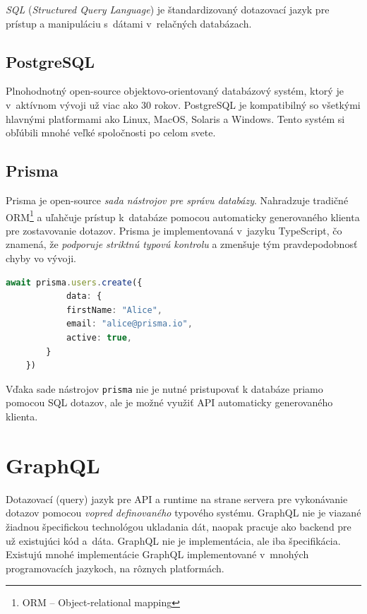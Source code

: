\noindent \emph{SQL} (\emph{Structured Query Language}) je štandardizovaný dotazovací jazyk pre prístup a manipuláciu s~dátami v~relačných databázach.

\subsection{PostgreSQL}
Plnohodnotný open-source objektovo-orientovaný databázový systém, ktorý je v~aktívnom vývoji už viac ako 30 rokov. PostgreSQL je kompatibilný so všetkými hlavnými platformami ako Linux, MacOS, Solaris a Windows. Tento systém si obľúbili mnohé veľké spoločnosti po celom svete. \cite{PostgreSQL}

\subsection{Prisma}
Prisma je open-source \emph{sada nástrojov pre správu databázy}. Nahradzuje tradičné ORM\footnote{ORM -- Object-relational mapping} a uľahčuje prístup k~databáze pomocou automaticky generovaného klienta pre zostavovanie dotazov. Prisma je implementovaná v~jazyku TypeScript, čo znamená, že \emph{podporuje striktnú typovú kontrolu} a zmenšuje tým pravdepodobnosť chyby vo vývoji. \cite{Prisma} \\

\begin{lstlisting}[language=TypeScript, caption=Príklad tvorby užívateľa pomocou nástroja Prisma. \cite{Prisma}]
	await prisma.users.create({
			data: {
			firstName: "Alice",
			email: "alice@prisma.io",
			active: true,
		}
	})
\end{lstlisting}

\noindent Vďaka sade nástrojov \texttt{prisma} nie je nutné pristupovať k databáze priamo pomocou SQL dotazov, ale je možné využiť API automaticky generovaného klienta.

\section{GraphQL}
\label{theory:graphql}
Dotazovací (query) jazyk pre API a runtime na strane servera pre vykonávanie dotazov pomocou \emph{vopred definovaného} typového systému. GraphQL nie je viazané žiadnou špecifickou technológou ukladania dát, naopak pracuje ako backend pre už existujúci kód a~dáta. \cite{GraphQL} GraphQL nie je implementácia, ale iba špecifikácia. Existujú mnohé implementácie GraphQL implementované v~mnohých programovacích jazykoch, na rôznych platformách. \\

